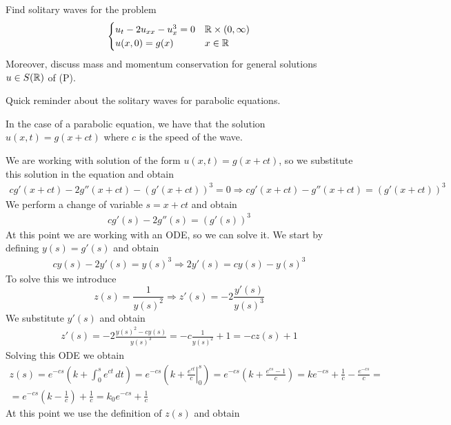 \newpage
\begin{exercise}
    Find solitary waves for the problem
    \[
        \begin{cases}
            u_t - 2u_{xx} - u_x^3 = 0 & \mathbb{R} \times (0, \infty) \\
            u(x, 0) = g(x) & x \in \mathbb{R}
        \end{cases}
    \]
    Moreover, discuss mass and momentum conservation for general solutions \(u \in S(\mathbb{R})\) of (P).
\end{exercise}
Quick reminder about the solitary waves for parabolic equations. 
\begin{remark}
    In the case of a parabolic equation, we have that the solution \(u(x,t) =  g(x + ct)\) where \(c\) is the speed of the wave.
\end{remark}
We are working with solution of the form \(u(x,t) = g(x + ct)\), so we substitute this solution in the equation and obtain
\[
    \begin{split}
        cg'(x+ct) - 2g''(x+ct) - (g'(x+ct))^3 = 0 \Rightarrow cg'(x+ct) - g''(x+ct) = (g'(x+ct))^3
    \end{split}
\]
We perform a change of variable \(s = x + ct\) and obtain
\[
    \begin{split}
        cg'(s) - 2g''(s) = (g'(s))^3
    \end{split}
\]
At this point we are working with an ODE, so we can solve it. We start by defining \(y(s) = g'(s)\) and obtain
\[
    \begin{split}
        cy(s) - 2y'(s) = y(s)^3 \Rightarrow 2y'(s) = cy(s) - y(s)^3 
    \end{split}
\]
To solve this we introduce 
\[
    z(s) = \frac{1}{y(s)^2} \Rightarrow z'(s) = -2 \frac{y'(s)}{y(s)^3} 
\]
We substitute \(y'(s)\) and obtain
\[
    \begin{split}
        z'(s) = -2 \frac{y(s)^2 - cy(s)}{y(s)^3} = -c \frac{1}{y(s)^2} + 1 = -c z(s) + 1
    \end{split}
\]
Solving this ODE we obtain
\[
    \begin{split}
        z(s) = e^{-cs} \left(k + \int_0^s e^{ct} \, dt\right) = e^{-cs} \left(k + \left. \frac{e^{ct}}{c} \right|_0^s\right) = e^{-cs} \left(k + \frac{e^{cs} - 1}{c}\right) = k e^{-cs} + \frac{1}{c} - \frac{e^{-cs}}{c} = \\
        = e^{-cs} \left(k - \frac{1}{c}\right) + \frac{1}{c} = k_0 e^{-cs} + \frac{1}{c}
    \end{split}
\]
At this point we use the definition of \(z(s)\) and obtain
